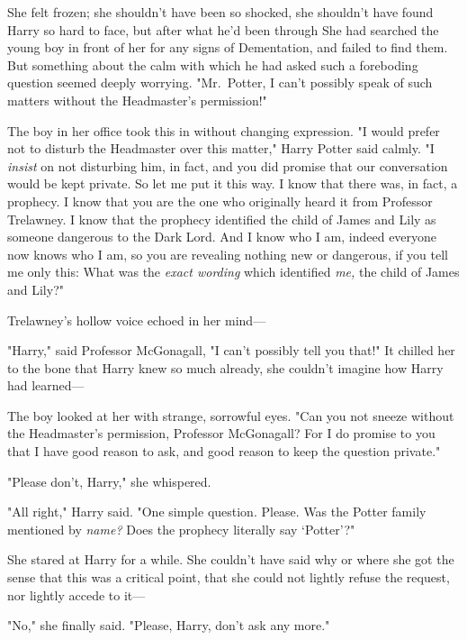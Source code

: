 She felt frozen; she shouldn't have been so shocked, she shouldn't have found
Harry so hard to face, but after what he'd been through{\el} She had
searched the young boy in front of her for any signs of Dementation, and failed
to find them. But something about the calm with which he had asked such a
foreboding question seemed deeply worrying. "Mr.~Potter, I can't possibly speak
of such matters without the Headmaster's permission!"

The boy in her office took this in without changing expression. "I would prefer
not to disturb the Headmaster over this matter," Harry Potter said calmly. "I
\emph{insist} on not disturbing him, in fact, and you did promise that our
conversation would be kept private. So let me put it this way. I know that
there was, in fact, a prophecy. I know that you are the one who originally
heard it from Professor Trelawney. I know that the prophecy identified the
child of James and Lily as someone dangerous to the Dark Lord. And I know who I
am, indeed everyone now knows who I am, so you are revealing nothing new or
dangerous, if you tell me only this: What was the \emph{exact wording} which
identified \emph{me,} the child of James and Lily?"

Trelawney's hollow voice echoed in her mind---

\noindent
{}

"Harry," said Professor McGonagall, "I can't possibly tell you that!" It
chilled her to the bone that Harry knew so much already, she couldn't imagine
how Harry had learned---

The boy looked at her with strange, sorrowful eyes. "Can you not sneeze without
the Headmaster's permission, Professor McGonagall? For I do promise to you that
I have good reason to ask, and good reason to keep the question private."

"Please don't, Harry," she whispered.

"All right," Harry said. "One simple question. Please. Was the Potter family
mentioned by \emph{name?} Does the prophecy literally say `Potter'?"

She stared at Harry for a while. She couldn't have said why or where she got
the sense that this was a critical point, that she could not lightly refuse the
request, nor lightly accede to it---

"No," she finally said. "Please, Harry, don't ask any more."

